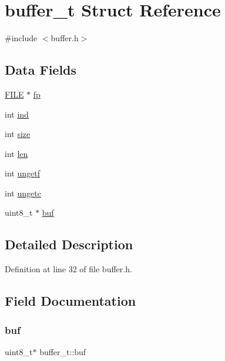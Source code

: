 \hypertarget{structbuffer__t}{}\section{buffer\+\_\+t Struct Reference}
\label{structbuffer__t}


{\ttfamily \#include $<$buffer.\+h$>$}

\subsection*{Data Fields}
\begin{DoxyCompactItemize}
\item 
\hyperlink{posix_8h_aed4dabeb9f7c518ded42f930a04abce8}{F\+I\+LE} $\ast$ \hyperlink{structbuffer__t_a00a55014e0827223c41b1b1d56e5be5d}{fp}
\item 
int \hyperlink{structbuffer__t_a59ea992e5006ead050862bae5c41670a}{ind}
\item 
int \hyperlink{structbuffer__t_a34e81d898c6accf4f06ed9c1133d6361}{size}
\item 
int \hyperlink{structbuffer__t_a0b67fc6880d331ae05dab0e58a4584c2}{len}
\item 
int \hyperlink{structbuffer__t_a67c2edddeca1858c670ff57e049a9e0e}{ungetf}
\item 
int \hyperlink{structbuffer__t_aa1fbbf42ce5d6278b21a93647bef3ff1}{ungetc}
\item 
uint8\+\_\+t $\ast$ \hyperlink{structbuffer__t_ab98e4f2d4fe10a680089d291ef1907c7}{buf}
\end{DoxyCompactItemize}


\subsection{Detailed Description}


Definition at line 32 of file buffer.\+h.



\subsection{Field Documentation}
\mbox{\label{structbuffer__t_ab98e4f2d4fe10a680089d291ef1907c7}} 
\subsubsection{\texorpdfstring{buf}{buf}}
{\footnotesize\ttfamily uint8\+\_\+t$\ast$ buffer\+\_\+t\+::buf}



